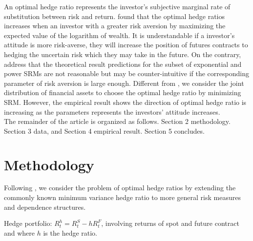 \documentclass[11pt,a4paper,english]{article}
\begin{document}
An optimal hedge ratio represents the investor's subjective marginal rate of substitution between risk and return. {\color{blue}\citet{cecchetti1988estimation}} found that the optimal hedge ratios increases when an investor with a greater risk aversion by maximizing the expected value of the logarithm of wealth. It is understandable if a investor's attitude is more risk-averse, they will increase the position of futures contracts to hedging the uncertain risk which they may take in the future. On the contrary, {\color{blue}\citet{brandtner2015decision}} address that the theoretical result predictions for the subset of exponential and power SRMs are not reasonable but may be counter-intuitive if the corresponding parameter of risk aversion is large enough. Different from {\color{blue}\citet{brandtner2015decision}}, we consider the joint distribution of financial assets to choose the optimal hedge ratio by minimizing SRM. However, the empirical result shows the direction of optimal hedge ratio is increasing as the parameters represents the investors' attitude increases. \\


The remainder
of the article is organized as follows. Section 2 methodology. Section 3 data, and Section 4 empirical result. Section 5 concludes.\\


\section{Methodology}
Following \citep{Barbi2014}, we consider the problem of optimal
hedge ratios by extending the commonly known minimum variance hedge
ratio to more general risk measures and dependence
structures.\medskip

Hedge portfolio: $R_t^h = R_t^S - h R_t^F$, involving returns of spot
and future contract and where $h$ is the hedge ratio.
\end{document}
